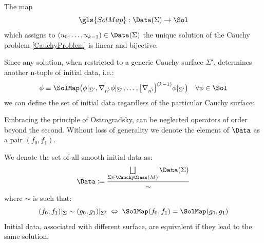 \documentclass[Main]{subfiles}
\begin{document}
			\begin{proposition}
				The map $$ 	 \gls{SolMap} : \Data (\Sigma ) \rightarrow \Sol $$ which assigns to $(u_0, \ldots, u_{k-1})\in \Data(\Sigma)$ the unique solution of the Cauchy problem \ref{CauchyProblem} is linear and bijective.
			\end{proposition}
			
			Since any solution, when restricted to a generic Cauchy surface $\Sigma'$, determines another n-tuple of initial data, i.e.:
			\begin{displaymath}
				\phi \equiv \SolMap \big(\phi \vert_{\Sigma'}, \nabla_{\vec{n'}}\phi\vert_{\Sigma'}, \ldots, 
				\big[\nabla_{\vec{n'}}\big]^{(k-1)}\phi \vert_{\Sigma'} \big)	\quad \forall \phi\in \Sol
			\end{displaymath}						
			we can define the set of initial data regardless of the particular Cauchy surface:			

			\begin{NB}
			
				Embracing the principle of Ostrogradsky, can be neglected operators of order	beyond the second.
				Without loss of generality we denote the element of $\Data$ as a pair $(f_0,f_1)$.
			\end{NB}			
			
			\begin{definition}\label{Def:DataSenzaSup}
				We denote the set of all smooth initial data as:
				\begin{displaymath}
					\Data  \coloneqq \frac{\bigsqcup\limits_{\Sigma \in \CauchyClass(M)}\Data(\Sigma)}{\sim} 
				\end{displaymath}
				where $\sim$ is such that:
				\begin{displaymath}
					(f_0, f_1)|_\Sigma \sim (g_0, g_1)|_{\Sigma'} \; \Leftrightarrow \; \SolMap(f_0,f_1) =  \SolMap(g_0,g_1) 
				\end{displaymath}
				\footnotesize{ Initial data, associated with different surface, are equivalent if they lead to the same solution.}	
			\end{definition}
			
\end{document}
